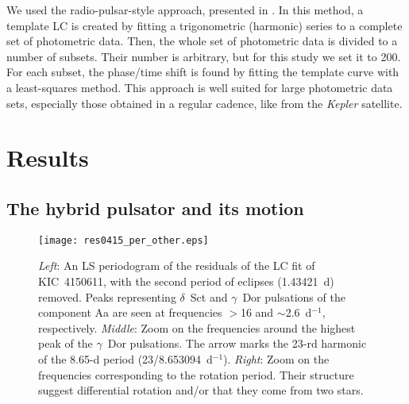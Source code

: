 \documentclass{aa}
\newcommand{\kep}{{\it Kepler }}
\begin{document}
We used the radio-pulsar-style approach, presented in \citet{koz11}. In this 
method, a template LC is created by fitting a trigonometric (harmonic) series 
to a complete set of photometric data. Then, the whole set of photometric data 
is divided to a number of subsets. Their number is arbitrary, but for this study
we set it to 200. For each subset, the phase/time shift is found by fitting 
the template curve with a least-squares method. This approach is well suited 
for large photometric data sets, especially those obtained in a regular cadence, 
like from the \kep satellite.


\section{Results}


\subsection{The hybrid pulsator and its motion}\label{sec_hyb}

\begin{figure*}
\centering
\texttt{[image: res0415\_per\_other.eps]}
\caption{{\it Left}: An LS periodogram of the residuals of the LC fit of KIC~4150611, 
with the second period of eclipses (1.43421~d) removed. Peaks representing 
$\delta$~Sct and $\gamma$~Dor pulsations of the component Aa are seen at 
frequencies $>$16 and $\sim$2.6~d$^{-1}$, respectively. 
{\it Middle}: Zoom on the frequencies around the highest peak of the 
$\gamma$~Dor pulsations. The arrow marks the 23-rd harmonic of the 8.65-d period 
(23/8.653094~d$^{-1}$). {\it Right}: Zoom on the frequencies corresponding to 
the rotation period. Their structure suggest differential rotation and/or 
that they come from two stars.
}\label{fig_per0415}
\end{figure*}
\end{document}
